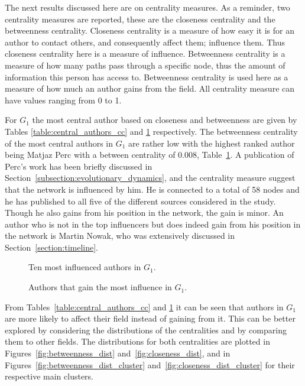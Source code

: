 \documentclass{article}
\theoremstyle{definition}
\begin{document}
The next results discussed here are on centrality measures. As a reminder,
two centrality measures are reported, these are the closeness centrality
and the betweenness centrality. Closeness centrality is a measure of how
easy it is for an author to contact others, and consequently affect them; influence them.
Thus closeness centrality here is a measure of influence. Betweenness centrality
is a measure of how many paths pass through a specific node, thus the amount
of information this person has access to. Betweenness centrality is used here
as a measure of how much an author gains from the field. All centrality measure
can have values ranging from 0 to 1.

For \(G_1\)
the most central author based on closeness and betweenness are given by Tables
\ref{table:central_authors_cc} and \ref{table:central_authors} respectively.
The betweenness centrality of the
most central authors in \(G_1\) are rather low with the highest ranked author
being Matjaz Perc with a between centrality of 0.008, Table~\ref{table:central_authors}.
A publication of Perc's work has been briefly discussed in
Section~\ref{subsection:evolutionary_dynamics}, and the centrality measure suggest that the network is influenced by him.
He is connected to a total of 58 nodes and he has published to all five of the different
sources considered in the study. Though he also gains from his position
in the network, the gain is minor. An author who is not in the top influencers but
does indeed gain from his position in the network is Martin Nowak, who was
extensively discussed in Section~\ref{section:timeline}.

\begin{figure}[H]
    \centering
    \begin{minipage}{.45\textwidth}
        \centering
        
        \caption{Ten most influenced authors in \(G_1\).}\label{table:central_authors_cc}
    \end{minipage}%
    \begin{minipage}{.45\textwidth}
        \centering
        
        \caption{Authors that gain the most influence in \(G_1\).}\label{table:central_authors}
    \end{minipage}
\end{figure}

From Tables~\ref{table:central_authors_cc} and \ref{table:central_authors} it
can be seen that authors in \(G_1\) are more likely to affect their field instead
of gaining from it. This can be better explored by considering the distributions
of the centralities and by comparing them to other fields.
The distributions for both centralities are
plotted in Figures~\ref{fig:betweenness_dist} and~\ref{fig:closeness_dist}, and
in Figures~\ref{fig:betweenness_dist_cluster} and~\ref{fig:closeness_dist_cluster}
for their respective main clusters.
\end{document}
